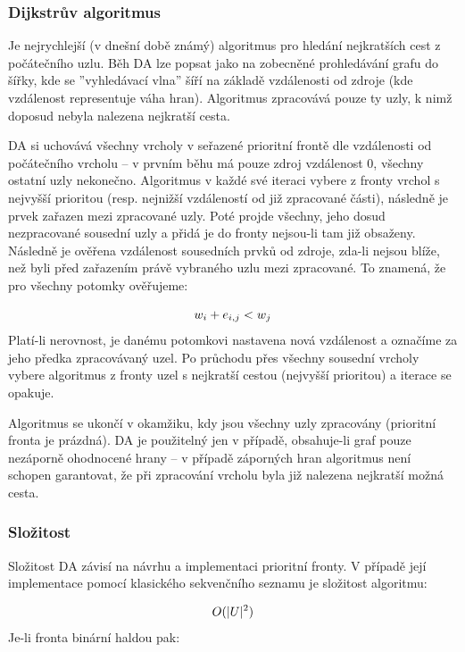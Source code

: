 \documentclass[czech, master, public, dept460, male, cpdeclaration, oneside]{diploma}
\begin{document}
\subsubsection{Dijkstrův algoritmus}
Je nejrychlejší (v dnešní době známý) algoritmus pro hledání nejkratších cest z počátečního uzlu. Běh DA lze popsat  jako na zobecněné prohledávání grafu do šířky, kde se ''vyhledávací vlna'' šíří na základě vzdálenosti od zdroje (kde vzdálenost representuje váha hran). Algoritmus zpracovává pouze ty uzly, k nimž doposud nebyla nalezena nejkratší cesta.\par
DA si uchovává všechny vrcholy v seřazené prioritní frontě dle vzdálenosti od počátečního vrcholu – v prvním běhu má pouze zdroj vzdálenost 0, všechny ostatní uzly nekonečno. Algoritmus v každé své iteraci vybere z fronty vrchol s nejvyšší prioritou (resp. nejnižší vzdáleností od již zpracované části), následně je prvek zařazen mezi zpracované uzly. Poté projde všechny, jeho dosud nezpracované sousední uzly a přidá je do fronty nejsou-li tam již obsaženy. Následně je ověřena vzdálenost sousedních prvků od zdroje, zda-li nejsou blíže, než byli před zařazením právě vybraného uzlu mezi zpracované. To znamená, že pro všechny potomky ověřujeme:

\begin{equation}
\vspace*{+3.0mm}
w_i + e_{i, j} < w_j
\end{equation}
\noindent
Platí-li nerovnost, je danému potomkovi nastavena nová vzdálenost a označíme za jeho předka zpracovávaný uzel. Po průchodu přes všechny sousední vrcholy vybere algoritmus z fronty uzel s nejkratší cestou (nejvyšší prioritou) a iterace se opakuje.\par
Algoritmus se ukončí v okamžiku, kdy jsou všechny uzly zpracovány (prioritní fronta je prázdná). DA je použitelný jen v případě, obsahuje-li graf pouze nezáporně ohodnocené hrany – v případě záporných hran algoritmus není schopen garantovat, že při zpracování vrcholu byla již nalezena nejkratší možná cesta. \cite{Kolar}

\subsubsection{Složitost}
Složitost DA závisí na návrhu a implementaci prioritní fronty. V případě její implementace pomocí klasického sekvenčního seznamu je složitost algoritmu:

\begin{equation}
\vspace*{+3.0mm}
O(|U|^2)
\end{equation}
\noindent
Je-li fronta binární haldou pak:
\end{document}
